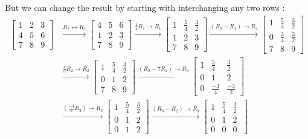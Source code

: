 \documentclass[a4paper,12pt]{article}
\begin{document}
But we can change the result by starting with interchanging any two rows :
\begin{align*}
  \begin{bmatrix}
    1 & 2 & 3 \\
    4 & 5 & 6 \\
    7 & 8 & 9
  \end{bmatrix} &\xrightarrow{{R_2}\leftrightarrow {R_1}}
  \begin{bmatrix}
    4 & 5 & 6 \\
    1 & 2 & 3 \\
    7 & 8 & 9
  \end{bmatrix} \xrightarrow{{\frac{1}{4}R_1}	\to{R_1}} 
  \begin{bmatrix}
    1 & \frac{5}{4} & \frac{3}{2} \\
    1 & 2 & 3 \\
    7 & 8 & 9
  \end{bmatrix} \xrightarrow{{(R_2-R_1)}	\to{R_2}}
  \begin{bmatrix}
    1 & \frac{5}{4} & \frac{3}{2} \\
    0 & \frac{3}{4} & \frac{3}{2} \\
    7 & 8 & 9
  \end{bmatrix}\\ &\xrightarrow{{\frac{4}{3}R_2}	\to{R_2}}
  \begin{bmatrix}
    1 & \frac{5}{4} & \frac{3}{2} \\
    0 & 1 & 2 \\
    7 & 8 & 9
  \end{bmatrix} \xrightarrow{{(R_3-7R_1)}	\to{R_3}} 
  \begin{bmatrix}
    1 & \frac{5}{4} & \frac{3}{2} \\
    0 & 1 & 2 \\
    0 & \frac{-3}{4} & \frac{-3}{2}
  \end{bmatrix}\\ &\xrightarrow{{(\frac{-4}{3}R_3)}	\to{R_3}}
  \begin{bmatrix}
    1 & \frac{5}{4} & \frac{3}{2} \\
    0 & 1 & 2 \\
    0 & 1 & 2
  \end{bmatrix} \xrightarrow{{(R_3-R_2)}	\to{R_3}}
   \begin{bmatrix}
    1 & \frac{5}{4} & \frac{3}{2} \\
    0 & 1 & 2 \\
    0 & 0 & 0.
  \end{bmatrix}
\end{align*}
\end{document}
